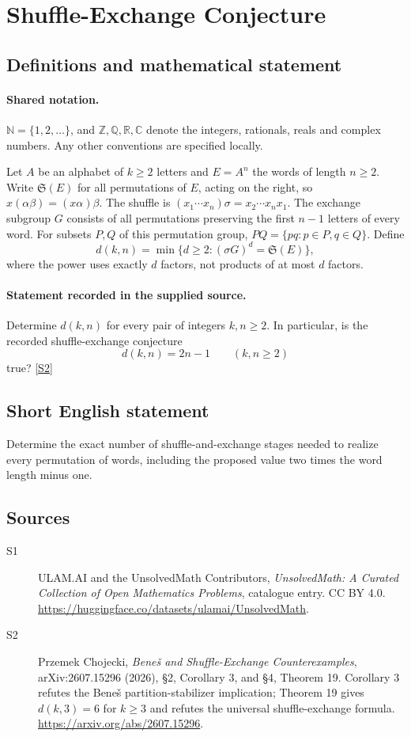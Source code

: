 \documentclass[11pt]{article}
\newcommand{\sref}[2]{\hyperlink{source:#1:#2}{[S#2]}}
\begin{document}
\section{Shuffle-Exchange Conjecture}\label{statement}

\subsection{Definitions and mathematical statement}

\paragraph{Shared notation.}$\mathbb N=\{1,2,\ldots\}$, and $\mathbb Z,\mathbb Q,\mathbb R,\mathbb C$ denote the integers, rationals, reals and complex numbers. Any other conventions are specified locally.


Let $A$ be an alphabet of $k\geq2$ letters and $E=A^n$ the words of length $n\geq2$. Write $\mathfrak S(E)$ for all permutations of $E$, acting on the right, so $x(\alpha\beta)=(x\alpha)\beta$. The shuffle is $(x_1\cdots x_n)\sigma=x_2\cdots x_nx_1$. The exchange subgroup $G$ consists of all permutations preserving the first $n-1$ letters of every word. For subsets $P,Q$ of this permutation group, $PQ=\{pq:p\in P,q\in Q\}$. Define
\[
 d(k,n)=\min\{d\geq2:(\sigma G)^d=\mathfrak S(E)\},
\]
where the power uses exactly $d$ factors, not products of at most $d$ factors.
\paragraph{Statement recorded in the supplied source.}
Determine $d(k,n)$ for every pair of integers $k,n\geq2$. In particular, is the recorded shuffle-exchange conjecture
\[
 d(k,n)=2n-1\qquad(k,n\geq2)
\]
true? \sref{statement}{2}
\subsection{Short English statement}
Determine the exact number of shuffle-and-exchange stages needed to realize every permutation of words, including the proposed value two times the word length minus one.
\subsection{Sources}
\begin{description}
\item[\hypertarget{source:statement:1}{S1}] ULAM.AI and the UnsolvedMath Contributors, \emph{UnsolvedMath: A Curated Collection of Open Mathematics Problems}, catalogue entry. CC BY 4.0. \url{https://huggingface.co/datasets/ulamai/UnsolvedMath}.
\item[\hypertarget{source:statement:2}{S2}] Przemek Chojecki, \emph{Beneš and Shuffle-Exchange Counterexamples}, arXiv:2607.15296 (2026), §2, Corollary 3, and §4, Theorem 19. Corollary 3 refutes the Beneš partition-stabilizer implication; Theorem 19 gives $d(k,3)=6$ for $k\geq3$ and refutes the universal shuffle-exchange formula. \url{https://arxiv.org/abs/2607.15296}.
\end{description}
\label{end:statement}
\end{document}
